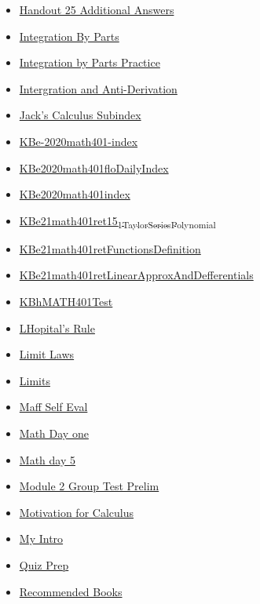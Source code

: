\documentclass[11pt]{article}
\begin{document}
\begin{itemize}
\begin{itemize}
\item \href{math401/KBe21math401retHandout25AreaBetweenCurves.org}{Handout 25 Additional Answers}
\item \href{math401/KBe21math401retHandout23IntegrationByParts.org}{Integration By Parts}
\item \href{math401/KBe21math401floIntegrationByPartsPractice.org}{Integration by Parts Practice}
\item \href{math401/KBhMATH401Intergrals.org}{Intergration and Anti-Derivation}
\item \href{math401/KBhMATH401SubIndex.org}{Jack's Calculus Subindex}
\item \href{math401/KBe-2020math401-index.org}{KBe-2020math401-index}
\item \href{math401/KBe2020math401floDailyIndex.org}{KBe2020math401floDailyIndex}
\item \href{math401/KBe2020math401index.org}{KBe2020math401index}
\item \href{math401/KBe21math401ret15\_1TaylorSeriesPolynomial.org}{KBe21math401ret15\textsubscript{1TaylorSeriesPolynomial}}
\item \href{math401/KBe21math401retFunctionsDefinition.org}{KBe21math401retFunctionsDefinition}
\item \href{math401/KBe21math401retLinearApproxAndDefferentials.org}{KBe21math401retLinearApproxAndDefferentials}
\item \href{math401/KBhMATH401Test.org}{KBhMATH401Test}
\item \href{math401/eRefLHopitalRule.org}{LHopital's Rule}
\item \href{math401/KBhMATH401LimitLaws.org}{Limit Laws}
\item \href{math401/KBhMATH401Limits.org}{Limits}
\item \href{math401/KBxMaffSSelfEval.org}{Maff Self Eval}
\item \href{math401/KB20200824094500.org}{Math Day one}
\item \href{math401/KBe20math401flo5.org}{Math day 5}
\item \href{math401/KBe20math401retModule2GroupTestPrelim.org}{Module 2 Group Test Prelim}
\item \href{math401/KBe2020math401floCalcMotivation.org}{Motivation for Calculus}
\item \href{math401/KBe2020math401ret0MyIntro.org}{My Intro}
\item \href{math401/KBe21math401refQuizPrep.org}{Quiz Prep}
\item \href{math401/KBe2020math401refRecommendedBooks.org}{Recommended Books}

\end{itemize}
\end{itemize}
\end{document}
